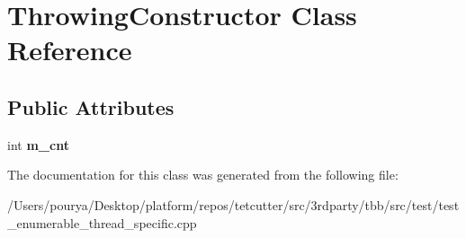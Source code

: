 \hypertarget{classThrowingConstructor}{}\section{Throwing\+Constructor Class Reference}
\label{classThrowingConstructor}
\subsection*{Public Attributes}
\begin{DoxyCompactItemize}
\item 
\hypertarget{classThrowingConstructor_a848335bfc07619b2f2fd905c8e97fe41}{}int {\bfseries m\+\_\+cnt}\label{classThrowingConstructor_a848335bfc07619b2f2fd905c8e97fe41}

\end{DoxyCompactItemize}


The documentation for this class was generated from the following file\+:\begin{DoxyCompactItemize}
\item 
/\+Users/pourya/\+Desktop/platform/repos/tetcutter/src/3rdparty/tbb/src/test/test\+\_\+enumerable\+\_\+thread\+\_\+specific.\+cpp\end{DoxyCompactItemize}
